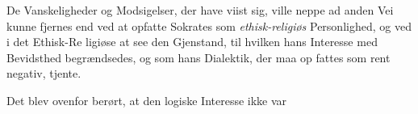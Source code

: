 \documentclass[12pt,a4paper]{book}
\begin{document}
De Vanskeligheder og Modsigelser, der have viist sig, ville
neppe ad anden Vei kunne fjernes end ved at opfatte Sokrates
som \emph{ethisk-religiøs} Personlighed, og ved i det Ethisk-Re\-%
ligiøse at see den Gjenstand, til hvilken hans Interesse med
Bevidsthed begrændsedes, og som hans Dialektik, der maa op\-%
fattes som rent negativ, tjente.

Det blev ovenfor berørt, at den logiske Interesse ikke var
\end{document}
